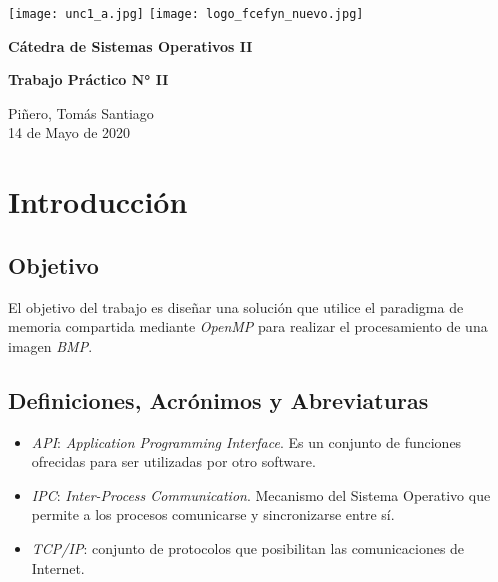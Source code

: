 \documentclass[12pt,a4paper]{article}
\renewcommand{\baselinestretch}{1} %
\begin{document}
\begin{titlepage}
    \begin{center}
      \vspace*{1cm}

      \vspace{2cm}
      \texttt{[image: unc1\_a.jpg]}
      \texttt{[image: logo\_fcefyn\_nuevo.jpg]}

      \Huge
      \textbf{Cátedra de Sistemas Operativos II}

      \vspace{3.5cm}

      \textbf{Trabajo Práctico N\si{\degree} II}

      \vfill

      \vspace{0.8cm}



      \Large
      Piñero, Tomás Santiago\\
      14 de Mayo de 2020
    \end{center}
\end{titlepage}

\setcounter{secnumdepth}{1}
\setcounter{tocdepth}{5}
\tableofcontents


\newpage
\renewcommand{\baselinestretch}{1}
\setlength{\parskip}{0.5em}

\section{Introducción}
\label{intro}

\subsection{Objetivo}
\label{objetivo}
El objetivo del trabajo es diseñar una solución que utilice el paradigma de
memoria compartida mediante \emph{OpenMP} para realizar el procesamiento de
una imagen \emph{BMP}.


\subsection{Definiciones, Acrónimos y Abreviaturas}
\label{daa}

\begin{itemize}
  \item \emph{API}: \emph{Application Programming Interface}. Es un conjunto
  de funciones ofrecidas para ser utilizadas por otro software.
  \item \emph{IPC}: \emph{Inter-Process Communication}. Mecanismo del Sistema
  Operativo que permite a los procesos comunicarse y sincronizarse entre sí.
  \item \emph{TCP/IP}: conjunto de protocolos que posibilitan las comunicaciones
  de Internet.
\end{itemize}
\end{document}

